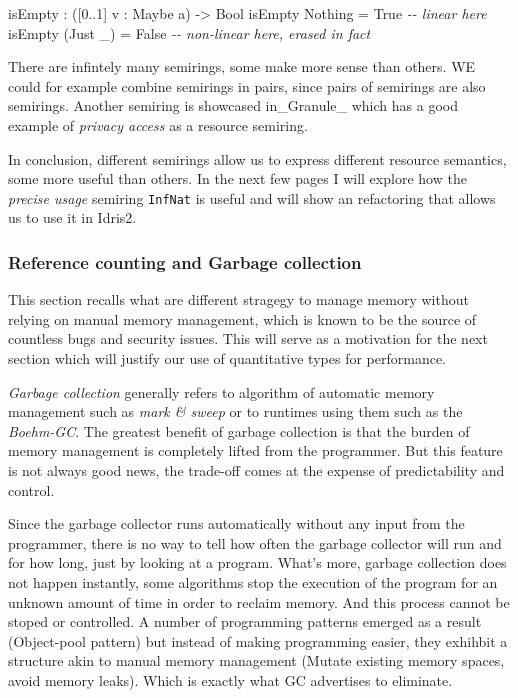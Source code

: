 \documentclass[
]{article}
\newenvironment{Shaded}{}{}
\newcommand{\CommentTok}[1]{\textcolor[rgb]{0.38,0.63,0.69}{\textit{#1}}}
\newcommand{\DataTypeTok}[1]{\textcolor[rgb]{0.56,0.13,0.00}{#1}}
\newcommand{\DecValTok}[1]{\textcolor[rgb]{0.25,0.63,0.44}{#1}}
\newcommand{\NormalTok}[1]{#1}
\newcommand{\OperatorTok}[1]{\textcolor[rgb]{0.40,0.40,0.40}{#1}}
\newcommand{\OtherTok}[1]{\textcolor[rgb]{0.00,0.44,0.13}{#1}}
\begin{document}
\begin{Shaded}
\begin{Highlighting}[]
\NormalTok{isEmpty }\OperatorTok{:}\NormalTok{ ([}\DecValTok{0}\OperatorTok{..}\DecValTok{1}\NormalTok{] v }\OperatorTok{:} \DataTypeTok{Maybe}\NormalTok{ a) }\OtherTok{{-}\textgreater{}} \DataTypeTok{Bool}
\NormalTok{isEmpty }\DataTypeTok{Nothing} \OtherTok{=} \DataTypeTok{True} \CommentTok{{-}{-} linear here}
\NormalTok{isEmpty (}\DataTypeTok{Just}\NormalTok{ \_) }\OtherTok{=} \DataTypeTok{False} \CommentTok{{-}{-} non{-}linear here, erased in fact}
\end{Highlighting}
\end{Shaded}

There are infintely many semirings, some make more sense than others. WE
could for example combine semirings in pairs, since pairs of semirings
are also semirings. Another semiring is showcased
in\_Granule\_\cite{granule} which has a good example of \emph{privacy
access} as a resource semiring.

In conclusion, different semirings allow us to express different
resource semantics, some more useful than others. In the next few pages
I will explore how the \emph{precise usage} semiring \texttt{InfNat} is
useful and will show an refactoring that allows us to use it in Idris2.

\hypertarget{reference-counting-and-garbage-collection}{%
\subsubsection{Reference counting and Garbage
collection}\label{reference-counting-and-garbage-collection}}

This section recalls what are different stragegy to manage memory
without relying on manual memory management, which is known to be the
source of countless bugs and security issues. This will serve as a
motivation for the next section which will justify our use of
quantitative types for performance.

\emph{Garbage collection} generally refers to algorithm of automatic
memory management such as \emph{mark \& sweep} or to runtimes using them
such as the \emph{Boehm-GC}. The greatest benefit of garbage collection
is that the burden of memory management is completely lifted from the
programmer. But this feature is not always good news, the trade-off
comes at the expense of predictability and control.

Since the garbage collector runs automatically without any input from
the programmer, there is no way to tell how often the garbage collector
will run and for how long, just by looking at a program. What's more,
garbage collection does not happen instantly, some algorithms stop the
execution of the program for an unknown amount of time in order to
reclaim memory. And this process cannot be stoped or controlled. A
number of programming patterns emerged as a result (Object-pool pattern)
but instead of making programming easier, they exhihbit a structure akin
to manual memory management (Mutate existing memory spaces, avoid memory
leaks). Which is exactly what GC advertises to eliminate.
\end{document}
